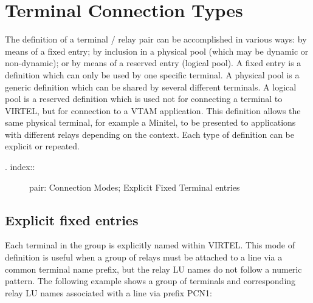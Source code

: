 \documentclass[letterpaper,10pt,english]{sphinxmanual}
\begin{document}
\section{Terminal Connection Types}
\label{\detokenize{connectivity_guide:terminal-connection-types}}\label{\detokenize{connectivity_guide:index-138}}
The definition of a terminal / relay pair can be accomplished in various ways: by means of a fixed entry; by inclusion in a physical pool (which may be dynamic or non-dynamic); or by means of a reserved entry (logical pool). A fixed entry is a definition which can only be used by one specific terminal. A physical pool is a generic definition which can be shared by several different terminals. A logical pool is a reserved definition which is used not for connecting a terminal to VIRTEL, but for connection to a VTAM application. This definition allows the same physical terminal, for example a Minitel, to be presented to applications with different relays depending on the context. Each type of definition can be explicit or repeated.
\begin{description}
\item[{. index::}] \leavevmode
pair: Connection Modes; Explicit Fixed Terminal entries

\end{description}


\subsection{Explicit fixed entries}
\label{\detokenize{connectivity_guide:explicit-fixed-entries}}
Each terminal in the group is explicitly named within VIRTEL. This mode of definition is useful when a group of relays must be attached to a line via a common terminal name prefix, but the relay LU names do not follow a numeric pattern. The following example shows a group of terminals and corresponding relay LU names associated with a line via prefix PCN1:
\end{document}
